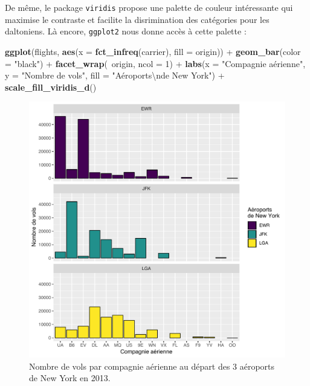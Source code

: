 \documentclass[a4paperpaper,]{article}
\newenvironment{Shaded}{\begin{snugshade}}{\end{snugshade}}
\newcommand{\CharTok}[1]{\textcolor[rgb]{0.57,0.30,0.62}{#1}}
\newcommand{\DataTypeTok}[1]{\textcolor[rgb]{0.00,0.34,0.68}{#1}}
\newcommand{\DecValTok}[1]{\textcolor[rgb]{0.69,0.50,0.00}{#1}}
\newcommand{\KeywordTok}[1]{\textcolor[rgb]{0.12,0.11,0.11}{\textbf{#1}}}
\newcommand{\NormalTok}[1]{\textcolor[rgb]{0.12,0.11,0.11}{#1}}
\newcommand{\OperatorTok}[1]{\textcolor[rgb]{0.12,0.11,0.11}{#1}}
\newcommand{\StringTok}[1]{\textcolor[rgb]{0.75,0.01,0.01}{#1}}
\theoremstyle{definition}
\theoremstyle{definition}
\theoremstyle{definition}
\theoremstyle{remark}
\begin{document}
De même, le package \texttt{viridis} propose une palette de couleur
intéressante qui maximise le contraste et facilite la disrimination des
catégories pour les daltoniens. Là encore, \texttt{ggplot2} nous donne
accès à cette palette :

\begin{Shaded}
\begin{Highlighting}[]
\KeywordTok{ggplot}\NormalTok{(flights, }\KeywordTok{aes}\NormalTok{(}\DataTypeTok{x =} \KeywordTok{fct_infreq}\NormalTok{(carrier), }\DataTypeTok{fill =}\NormalTok{ origin)) }\OperatorTok{+}
\StringTok{  }\KeywordTok{geom_bar}\NormalTok{(}\DataTypeTok{color =} \StringTok{"black"}\NormalTok{) }\OperatorTok{+}
\StringTok{  }\KeywordTok{facet_wrap}\NormalTok{(}\OperatorTok{~}\NormalTok{origin, }\DataTypeTok{ncol =} \DecValTok{1}\NormalTok{) }\OperatorTok{+}
\StringTok{  }\KeywordTok{labs}\NormalTok{(}\DataTypeTok{x =} \StringTok{"Compagnie aérienne"}\NormalTok{,}
       \DataTypeTok{y =} \StringTok{"Nombre de vols"}\NormalTok{,}
       \DataTypeTok{fill =} \StringTok{"Aéroports}\CharTok{\textbackslash{}n}\StringTok{de New York"}\NormalTok{) }\OperatorTok{+}
\StringTok{  }\KeywordTok{scale_fill_viridis_d}\NormalTok{()}
\end{Highlighting}
\end{Shaded}

\begin{figure}[htpb]

{\centering \includegraphics[width=0.9\linewidth]{figure/barfacetviridis-1} 

}

\caption{Nombre de vols par compagnie aérienne au départ des 3 aéroports de New York en 2013.}\label{fig:barfacetviridis}
\end{figure}
\end{document}
